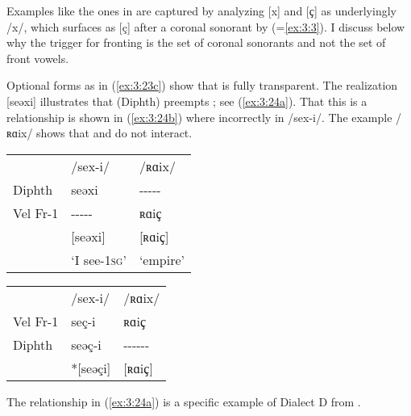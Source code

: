 Examples like the ones in  are captured by analyzing [x] and [{ҫ] as underlyingly /x/, which surfaces as [ç] after a coronal sonorant by  (=\ref{ex:3:3}). I discuss below why the trigger for fronting is the set of coronal sonorants and not the set of front vowels.}

Optional forms as in (\ref{ex:3:23c}) show that  is fully transparent. The realization [seəxi] illustrates that  (Diphth) preempts ; see (\ref{ex:3:24a}). That this is a  relationship is shown in (\ref{ex:3:24b}) where  incorrectly   in /sex-i/. The example /ʀɑix/ shows that  and  do not interact.

\ea%
    \label{ex:3:24}
    \begin{multicols}{2}\raggedcolumns
\ea \label{ex:3:24a} \begin{tabular}[t]{@{}lll@{}}
              &  /sex-i/         &  /ʀɑix/       \\    
     Diphth   &   seəxi          &  -{}-{}-{}-{}-\\     
     Vel Fr-1 &  {}-{}-{}-{}-{}- &  ʀɑi{ҫ}       \\
              & [seəxi]          & [ʀɑi{ҫ]}      \\    
              & ‘I see-\textsc{1sg}’          & ‘empire’      \\
    \end{tabular}\columnbreak
\ex \label{ex:3:24b} \begin{tabular}[t]{@{}lll@{}}
            &  /sex-i/ &  /ʀɑix/          \\
   Vel Fr-1 &  seç-i   & ʀɑi{ҫ}           \\
    Diphth  &  seəç-i  &  -{}-{}-{}-{}-{}-\\
            & *[seəçi] &  [ʀɑi{ҫ]}        \\
    \end{tabular}
\z \end{multicols}
\z 

The  relationship in (\ref{ex:3:24a}) is a specific example of Dialect D from .

